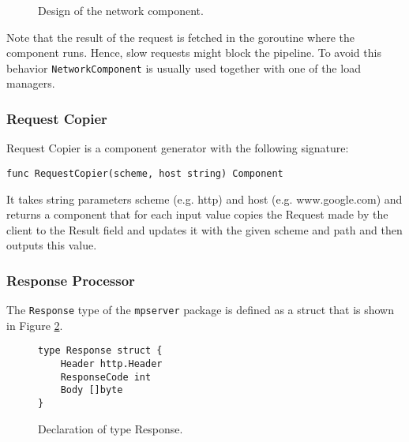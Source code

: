 \begin{figure}[h]
\centering
{}
\caption[scale=1.0]{Design of the network component.}
\label{fig:networkComp}
\end{figure}

Note that the result of the request is fetched in the goroutine where the
component runs. Hence, slow requests might block the pipeline. To avoid
this behavior \texttt{NetworkComponent} is usually used together with one
of the load managers.

\subsubsection{Request Copier}
Request Copier is a component generator with the following signature:
\begin{lstlisting}
func RequestCopier(scheme, host string) Component
\end{lstlisting}
It takes string parameters scheme (e.g. http) and host (e.g. www.google.com) 
and returns a component that for each input value copies the Request made 
by the client to the Result field and updates it with the given scheme and 
path and then outputs this value.

\subsubsection{Response Processor}
The \texttt{Response} type of the \texttt{mpserver} package is defined as
a struct that is shown in Figure \ref{fig:Response}.
\begin{figure}[h]
\centering
\begin{lstlisting}
type Response struct {
    Header http.Header
    ResponseCode int
    Body []byte
}
\end{lstlisting}
\caption[scale=1.0]{Declaration of type Response.}
\label{fig:Response}
\end{figure}

